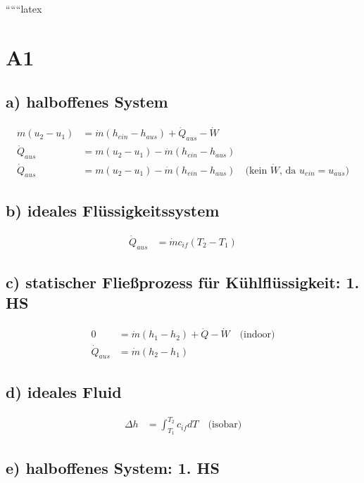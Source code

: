 
``````latex


\section*{A1}

\subsection*{a) halboffenes System}

\begin{align*}
    m(u_2 - u_1) &= \dot{m} (h_{ein} - h_{aus}) + \dot{Q}_{aus} - \dot{W} \\
    \dot{Q}_{aus} &= m(u_2 - u_1) - \dot{m} (h_{ein} - h_{aus}) \\
    \dot{Q}_{aus} &= m(u_2 - u_1) - \dot{m} (h_{ein} - h_{aus}) \quad \text{(kein $\dot{W}$, da $u_{ein} = u_{aus}$)}
\end{align*}

\subsection*{b) ideales Flüssigkeitssystem}

\begin{align*}
    \dot{Q}_{aus} &= \dot{m} c_{if} (T_2 - T_1)
\end{align*}

\subsection*{c) statischer Fließprozess für Kühlflüssigkeit: 1. HS}

\begin{align*}
    0 &= \dot{m} (h_1 - h_2) + \dot{Q} - \dot{W} \quad \text{(indoor)} \\
    \dot{Q}_{aus} &= \dot{m} (h_2 - h_1)
\end{align*}

\subsection*{d) ideales Fluid}

\begin{align*}
    \Delta h &= \int_{T_1}^{T_2} c_{if} dT \quad \text{(isobar)}
\end{align*}

\subsection*{e) halboffenes System: 1. HS}

